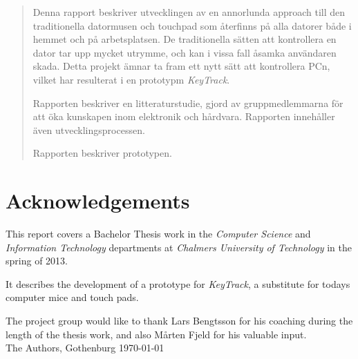 \renewcommand{\abstractname}{Sammandrag}
\begin{abstract}
Denna rapport beskriver utvecklingen av en annorlunda approach till den traditionella
datormusen och touchpad som återfinns på alla datorer både i hemmet och på arbetsplatsen.
De traditionella sätten att kontrollera en dator tar upp mycket utrymme, och kan i vissa 
fall åsamka användaren skada. Detta projekt ämnar ta fram ett nytt sätt att kontrollera PCn,
vilket har resulterat i en prototypm \emph{KeyTrack}.

Rapporten beskriver en litteraturstudie, gjord av gruppmedlemmarna för att öka kunskapen inom
elektronik och hårdvara. Rapporten innehåller även utvecklingsprocessen.

Rapporten beskriver prototypen.


\end{abstract}

\newpage
\clearpage

\mbox{}
\newpage
\clearpage
\thispagestyle{empty}
\section*{Acknowledgements}
This report covers a Bachelor Thesis work in the \emph{Computer Science} and
\emph{Information Technology} departments at \emph{Chalmers University of Technology}
in the spring of 2013.

It describes the development of a prototype for \emph{KeyTrack}, a substitute for todays
computer mice and touch pads.

The project group would like to thank Lars Bengtsson for his coaching during the length
of the thesis work, and also Mårten Fjeld for his valuable input. \\[1cm]

\hfill The Authors, Gothenburg \today
\newpage
\clearpage
\mbox{}